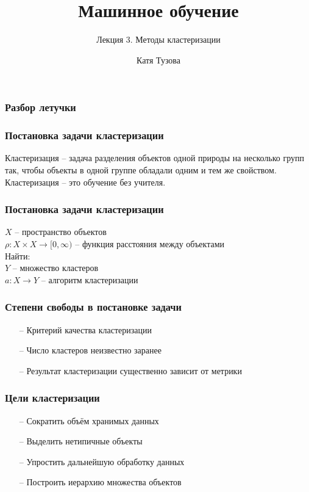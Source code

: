 \documentclass[12pt]{beamer}
\author{Катя Тузова}
\title{Машинное обучение}
\subtitle{Лекция 3. Методы кластеризации}
\date{}
\begin{document}
\frame{\titlepage}


\begin{frame}\frametitle{Разбор летучки}
\end{frame}

\begin{frame}\frametitle{Постановка задачи кластеризации}
Кластеризация -- задача разделения объектов одной природы на несколько групп так, чтобы объекты в одной группе обладали одним и тем же свойством.\\
\vspace{5mm}
Кластеризация -- это обучение без учителя.
\end{frame}

\begin{frame}\frametitle{Постановка задачи кластеризации}
$X$ -- пространство объектов\\
$\rho: X \times X \rightarrow [0, \infty)$ -- функция расстояния между объектами\\
\vspace{5mm}
Найти:\\
$Y$ -- множество кластеров \\
$a: X \rightarrow Y$ -- алгоритм кластеризации
\vspace{5mm}

\end{frame}

\begin{frame}\frametitle{Степени свободы в постановке задачи}
	\begin{itemize}
		\item[--] Критерий качества кластеризации
		\item[--] Число кластеров неизвестно заранее
		\item[--] Результат кластеризации существенно зависит от метрики
	\end{itemize}
\end{frame}

\begin{frame}\frametitle{Цели кластеризации}
	\begin{itemize}
		\item[--] Сократить объём хранимых данных
		\item[--] Выделить нетипичные объекты
		\item[--] Упростить дальнейшую обработку данных
		\item[--] Построить иерархию множества объектов				
	\end{itemize}
\end{frame}
\end{document}
